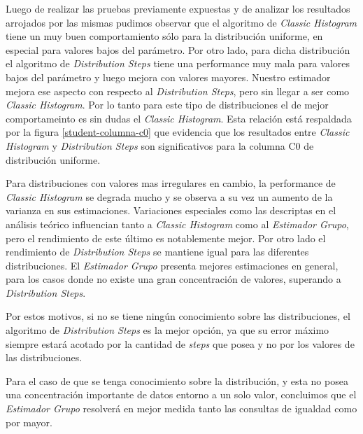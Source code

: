 \documentclass[a4paper, 10pt, twoside]{article}
\begin{document}
Luego de realizar las pruebas previamente expuestas y de analizar los resultados arrojados por las mismas pudimos observar que el algoritmo de \textit{Classic Histogram}
tiene un muy buen comportamiento sólo para la distribución uniforme, en especial para valores bajos del parámetro. Por otro lado, para dicha distribución el algoritmo de \textit{Distribution Steps} tiene una performance muy mala para valores bajos del parámetro y luego mejora con valores mayores. Nuestro estimador mejora ese aspecto con respecto al \textit{Distribution Steps}, pero sin llegar a ser como \textit{Classic Histogram}. Por lo tanto para este tipo de distribuciones el de mejor comportameinto es sin dudas el \textit{Classic Histogram}. Esta relación está respaldada por la figura \ref{student-columna-c0} que evidencia que los resultados entre \textit{Classic Histogram} y \textit{Distribution Steps} son significativos para la columna C0 de distribución uniforme.

Para distribuciones con valores mas irregulares en cambio, la performance de \textit{Classic Histogram} se degrada mucho y se observa a su vez un aumento de la varianza en sus estimaciones. Variaciones especiales como las descriptas en el análisis teórico influencian tanto a \textit{Classic Histogram} como al \textit{Estimador Grupo}, pero el rendimiento de este último es notablemente mejor. Por otro lado el rendimiento de \textit{Distribution Steps} se mantiene igual para las diferentes distribuciones. El \textit{Estimador Grupo} presenta mejores estimaciones en general, para los casos donde no existe una gran concentración de valores, superando a \textit{Distribution Steps}.

Por estos motivos, si no se tiene ningún conocimiento sobre las distribuciones, el algoritmo de \textit{Distribution Steps} es la mejor opción, ya que su error máximo siempre estará acotado por la cantidad de \textit{steps} que posea y no por los valores de las distribuciones.

Para el caso de que se tenga conocimiento sobre la distribución, y esta no posea una concentración importante de datos entorno a un solo valor, concluimos que el \textit{Estimador Grupo} resolverá en mejor medida tanto las consultas de igualdad como por mayor.
\end{document}
